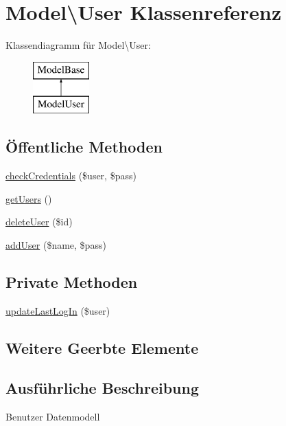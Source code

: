 \hypertarget{class_model_1_1_user}{\section{Model\textbackslash{}User Klassenreferenz}
\label{class_model_1_1_user}
}
Klassendiagramm für Model\textbackslash{}User\-:\begin{figure}[H]
\begin{center}
\leavevmode
\includegraphics[height=2.000000cm]{class_model_1_1_user}
\end{center}
\end{figure}
\subsection*{Öffentliche Methoden}
\begin{DoxyCompactItemize}
\item 
\hyperlink{class_model_1_1_user_a6f75fbb91daa84c817340a254bd1aa6f}{check\-Credentials} (\$user, \$pass)
\item 
\hyperlink{class_model_1_1_user_a306c9d8207c01a0dc603dd3fa148094c}{get\-Users} ()
\item 
\hyperlink{class_model_1_1_user_a458a6d6adff444603045434301b02246}{delete\-User} (\$id)
\item 
\hyperlink{class_model_1_1_user_a7a13080a106b3b3adb0b4856c144064e}{add\-User} (\$name, \$pass)
\end{DoxyCompactItemize}
\subsection*{Private Methoden}
\begin{DoxyCompactItemize}
\item 
\hyperlink{class_model_1_1_user_a45d6132fe4ea721dea485ff7c65bc412}{update\-Last\-Log\-In} (\$user)
\end{DoxyCompactItemize}
\subsection*{Weitere Geerbte Elemente}


\subsection{Ausführliche Beschreibung}
Benutzer Datenmodell 

